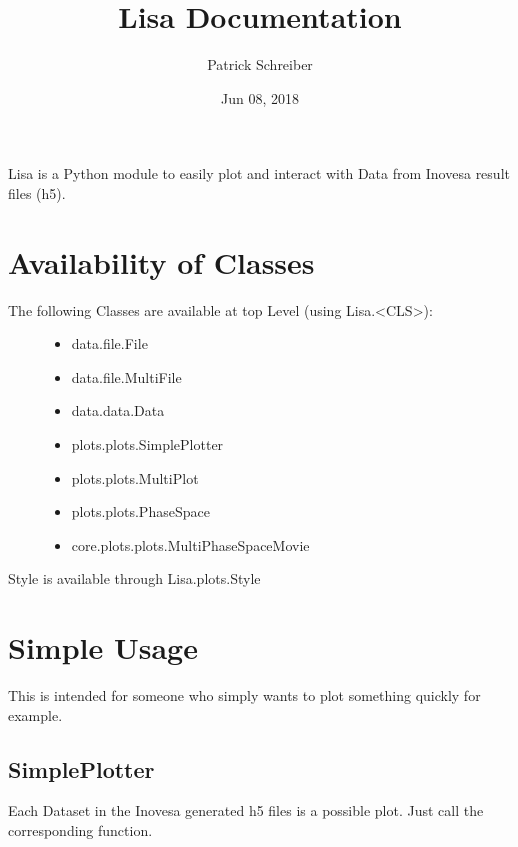 \documentclass[letterpaper,10pt,openany,oneside,english]{sphinxmanual}
\title{Lisa Documentation}
\date{Jun 08, 2018}
\author{Patrick Schreiber}
\begin{document}
\maketitle
\sphinxtableofcontents
{}\label{\detokenize{index::doc}}


Lisa is a Python module to easily plot and interact with Data from Inovesa result files (h5).


\chapter{Availability of Classes}
\label{\detokenize{availability:welcome-to-lisa-s-documentation}}\label{\detokenize{availability::doc}}\label{\detokenize{availability:availability-of-classes}}\begin{description}
\item[{The following Classes are available at top Level (using Lisa.\textless{}CLS\textgreater{}):}] \leavevmode\begin{itemize}
\item {} 
data.file.File

\item {} 
data.file.MultiFile

\item {} 
data.data.Data

\item {} 
plots.plots.SimplePlotter

\item {} 
plots.plots.MultiPlot

\item {} 
plots.plots.PhaseSpace

\item {} 
core.plots.plots.MultiPhaseSpaceMovie

\end{itemize}

\end{description}

Style is available through Lisa.plots.Style


\chapter{Simple Usage}
\label{\detokenize{simpleusage:simple-usage}}\label{\detokenize{simpleusage::doc}}
This is intended for someone who simply wants to plot something quickly for example.


\section{SimplePlotter}
\label{\detokenize{simpleusage:simpleplotter}}
Each Dataset in the Inovesa generated h5 files is a possible plot. Just call the corresponding function.
\end{document}
